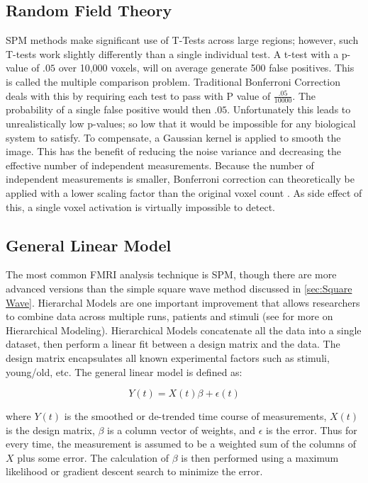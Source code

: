 \subsection{Random Field Theory}
\label{sec:RFT}
SPM methods make significant use of T-Tests across large regions;
however, such T-tests work slightly differently than a single
individual test. A t-test with a p-value of $.05$ over 
10,000 voxels, will on average generate 500 false
positives. This is called the multiple comparison problem. Traditional
Bonferroni Correction
deals with this by requiring each test to pass with P
value of $\frac{.05}{10000}$. The probability of 
a single false positive would then $.05$. Unfortunately this leads to unrealistically
low p-values; so low that it would be impossible for any biological system to satisfy. To
compensate, a Gaussian kernel is applied to smooth the image. This has
the benefit of reducing the noise variance and 
decreasing the effective number of independent measurements. Because
the number of independent measurements is smaller, Bonferroni correction
can theoretically be applied with a lower scaling factor than
the original voxel count \cite{Worsley2004}. As side effect of this,
a single voxel activation is virtually impossible to detect.

\subsection{General Linear Model}
\label{sec:Current Techniques General Linear Model}
The most common FMRI analysis technique is SPM, though there
are more advanced versions than the simple square wave
method discussed in \autoref{sec:Square Wave}. Hierarchal
Models are one important improvement that allows researchers
to combine data across multiple runs, patients and stimuli
(see \cite{Hofmann1997} for more on Hierarchical Modeling). 
Hierarchical Models
concatenate all the data into a single dataset, then perform
a linear fit between a design matrix and the data. The design matrix
encapsulates all known experimental factors such as stimuli,
young/old, etc.  The general linear model is defined as:

\begin{equation}
Y(t) = X(t)\beta + \epsilon(t)
\end{equation}

where $Y(t)$ is the smoothed or de-trended time course of measurements,
$X(t)$ is the design matrix, $\beta$ is a column vector of weights,
and $\epsilon$ is the error. Thus for every time, the measurement is
assumed to be a weighted sum of the columns of $X$ plus some error. The calculation
of $\beta$ is then performed using a maximum likelihood or gradient descent search 
to minimize the error. 

